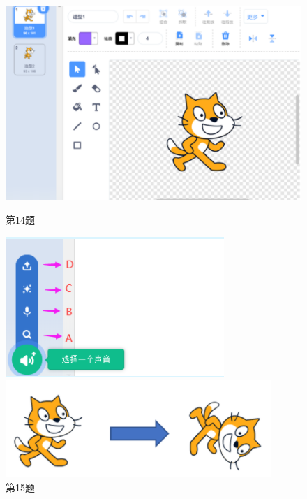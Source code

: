 \documentclass[10pt, a4paper]{article}
\begin{document}
\begin{enumerate}
        \begin{figure}[htbp]
            \centering
            \begin{minipage}[t]{.2\textwidth}
                \centering
                \includegraphics[width=\textwidth]{14.png}
                \caption*{第14题}
            \end{minipage}
            \begin{minipage}[t]{.2\textwidth}
                \centering
                \includegraphics[width=\textwidth]{15.png}
                \caption*{第15题}
            \end{minipage}
            \begin{minipage}[t]{.23\textwidth}
                \centering
                \includegraphics[width=\textwidth]{16.png}

\end{minipage}
\end{figure}
\end{enumerate}
\end{document}
